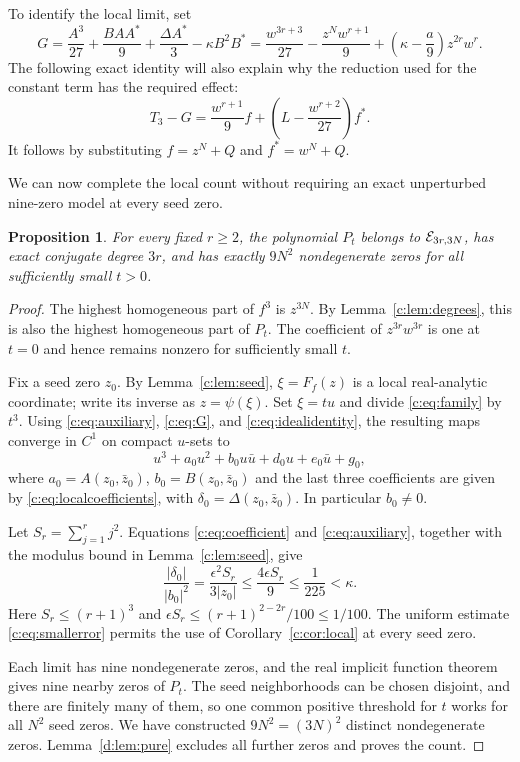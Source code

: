 \documentclass[UTF8,11pt]{ctexart}
\newtheorem{prop}[thm]{Proposition}
\theoremstyle{definition}
\numberwithin{equation}{section}
\begin{document}
To identify the local limit, set
\begin{equation}\label{c:eq:G}
 G=\frac{A^3}{27}+\frac{BAA^*}{9}
          +\frac{\Delta A^*}{3}-\kappa B^2B^*
   =\frac{w^{3r+3}}{27}-\frac{z^Nw^{r+1}}9
          +\left(\kappa-\frac a9\right)z^{2r}w^r.
\end{equation}
The following exact identity will also explain why the reduction used
for the constant term has the required effect:
\begin{equation}\label{c:eq:idealidentity}
 T_3-G=\frac{w^{r+1}}9f+
                \left(L-\frac{w^{r+2}}{27}\right)f^*.
\end{equation}
It follows by substituting $f=z^N+Q$ and $f^*=w^N+Q$.

We can now complete the local count without requiring an exact
unperturbed nine-zero model at every seed zero.
\begin{prop}\label{c:prop:family}
For every fixed $r\ge2$, the polynomial $P_t$ belongs to
$\mathcal E_{3r,3N}$, has exact conjugate degree $3r$, and has exactly
$9N^2$ nondegenerate zeros for all sufficiently small $t>0$.
\end{prop}
\begin{proof}
The highest homogeneous part of $f^3$ is $z^{3N}$. By
Lemma~\ref{c:lem:degrees}, this is also the highest homogeneous part of
$P_t$. The coefficient of $z^{3r}w^{3r}$ is one at $t=0$ and hence
remains nonzero for sufficiently small $t$.

Fix a seed zero $z_0$. By Lemma~\ref{c:lem:seed},
$\xi=F_f(z)$ is a local real-analytic coordinate; write its inverse
as $z=\psi(\xi)$. Set $\xi=tu$ and divide \eqref{c:eq:family} by $t^3$.
Using \eqref{c:eq:auxiliary}, \eqref{c:eq:G}, and
\eqref{c:eq:idealidentity}, the resulting maps converge in $C^1$ on
compact $u$-sets to
\[
 u^3+a_0u^2+b_0u\bar u+d_0u+e_0\bar u+g_0,
\]
where $a_0=A(z_0,\bar z_0)$, $b_0=B(z_0,\bar z_0)$ and the last
three coefficients are given by \eqref{c:eq:localcoefficients}, with
$\delta_0=\Delta(z_0,\bar z_0)$. In particular $b_0\ne0$.

Let $S_r=\sum_{j=1}^rj^2$. Equations \eqref{c:eq:coefficient} and
\eqref{c:eq:auxiliary}, together with the modulus bound in
Lemma~\ref{c:lem:seed}, give
\begin{equation}\label{c:eq:smallerror}
 \frac{|\delta_0|}{|b_0|^2}
 =\frac{\epsilon^2S_r}{3|z_0|}
 \le\frac{4\epsilon S_r}{9}
 \le\frac1{225}<\kappa.
\end{equation}
Here $S_r\le(r+1)^3$ and
$\epsilon S_r\le(r+1)^{2-2r}/100\le1/100$.
The uniform estimate \eqref{c:eq:smallerror} permits the use of
Corollary~\ref{c:cor:local} at every seed zero.

Each limit has nine nondegenerate zeros, and the real implicit function
theorem gives nine nearby zeros of $P_t$. The seed neighborhoods can
be chosen disjoint, and there are finitely many of them, so one common
positive threshold for $t$ works for all $N^2$ seed zeros. We have
constructed $9N^2=(3N)^2$ distinct nondegenerate zeros.
Lemma~\ref{d:lem:pure} excludes all further zeros and proves the count.
\end{proof}
\end{document}
